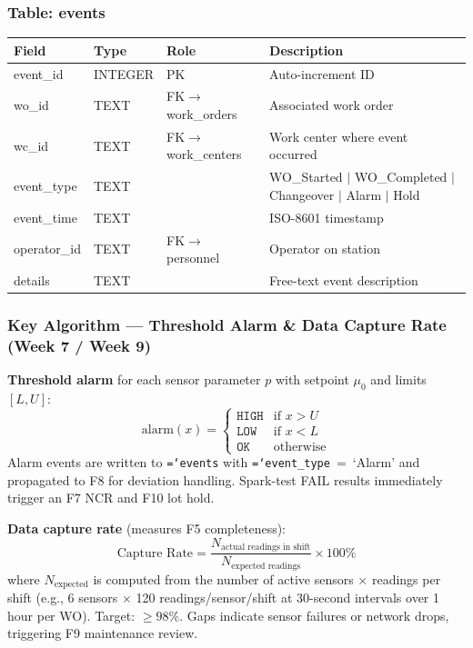 \documentclass[11pt]{article}
\newcommand{\tfield}[1]{\texttt{\hyphenchar\font=`\-\relax #1}}
\begin{document}
\subsubsection*{Table: events}
\begin{table}[H]\centering\small
\begin{tabular}{@{} l l l L{5.0cm} @{}}
\toprule
\textbf{Field} & \textbf{Type} & \textbf{Role} & \textbf{Description} \\
\midrule
event\_id    & INTEGER & PK  & Auto-increment ID \\
wo\_id       & TEXT    & FK$\to$work\_orders & Associated work order \\
wc\_id       & TEXT    & FK$\to$work\_centers & Work center where event occurred \\
event\_type  & TEXT    &     & WO\_Started $\mid$ WO\_Completed $\mid$ Changeover $\mid$ Alarm $\mid$ Hold \\
event\_time  & TEXT    &     & ISO-8601 timestamp \\
operator\_id & TEXT    & FK$\to$personnel & Operator on station \\
details     & TEXT    &     & Free-text event description \\
\bottomrule
\end{tabular}
\end{table}

\subsubsection*{Key Algorithm --- Threshold Alarm \& Data Capture Rate (Week 7 / Week 9)}

\textbf{Threshold alarm} for each sensor parameter $p$ with setpoint $\mu_0$ and limits $[L, U]$:
\[
\text{alarm}(x) = \begin{cases} \texttt{HIGH} & \text{if } x > U \\ \texttt{LOW} & \text{if } x < L \\ \texttt{OK} & \text{otherwise} \end{cases}
\]
Alarm events are written to \tfield{events} with \tfield{event\_type}~=~`Alarm' and propagated to F8 for deviation handling.  Spark-test FAIL results immediately trigger an F7 NCR and F10 lot hold.

\textbf{Data capture rate} (measures F5 completeness):
\[
\text{Capture Rate} = \frac{N_{\text{actual readings in shift}}}{N_{\text{expected readings}}} \times 100\%
\]
where $N_{\text{expected}}$ is computed from the number of active sensors $\times$ readings per shift (e.g., 6 sensors $\times$ 120 readings/sensor/shift at 30-second intervals over 1 hour per WO).  Target: $\geq 98\%$.  Gaps indicate sensor failures or network drops, triggering F9 maintenance review.
\end{document}
